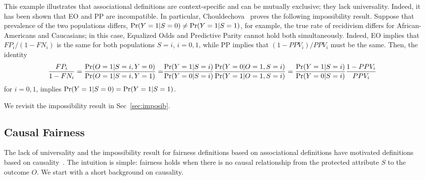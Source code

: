 \documentclass[11pt]{article}
\begin{document}
This example illustrates that associational definitions are context-specific and can be mutually exclusive; they lack universality. Indeed, it has been shown that EO and PP are incompatible. In particular, Chouldechova~\cite{chouldechova2017fair} proves the following impossibility result.  Suppose that prevalence of the two populations differs,  ${\tt \mathrm{Pr}}(Y=1|S=0) \neq {\tt \mathrm{Pr}}(Y=1|S=1)$, for example, the true rate of recidivism differs for African-Americans and Caucasians; in this case, Equalized Odds and Predictive Parity cannot hold both simultaneously. Indeed, EO implies that $FP_i/(1-FN_i)$ is the same for both populations $S=i$, $i=0,1$, while PP implies that $(1-PPV_i)/PPV_i$ must be the same.  Then, the identity
%
{\small 
\begin{align*}
\frac{FP_i}{1-FN_i} = \frac{\pr(O=1|S=i,Y=0)}{\pr(O=1|S=i,Y=1)} =
%
 &  \frac{\pr(Y=1|S=i)}{\pr(Y=0|S=i)}  \frac{\pr(Y=0|O=1,S=i)}{\pr(Y=1|O=1,S=i)}
= \frac{\pr(Y=1|S=i)}{\pr(Y=0|S=i)} \frac{1-PPV_i}{PPV_i}
\end{align*}
}
%
for $i=0,1$, implies ${\tt \mathrm{Pr}}(Y=1|S=0) = {\tt \mathrm{Pr}}(Y=1|S=1)$.
%
%
We revisit the impossibility result in Sec~\ref{sec:imposib}.
\vspace{-0.3cm}


\subsection{Causal Fairness}

\label{sec:cf}
The lack of universality and the impossibility result for fairness definitions based on associational definitions have motivated definitions based on causality~\cite{kusner2017counterfactual,kilbertus2017avoiding,nabi2018fair,russell2017worlds,galhotra2017fairness}.  The intuition is simple: fairness holds when there is no causal relationship from the protected attribute $S$ to the outcome $O$.  We start with a short background on causality.
\end{document}
